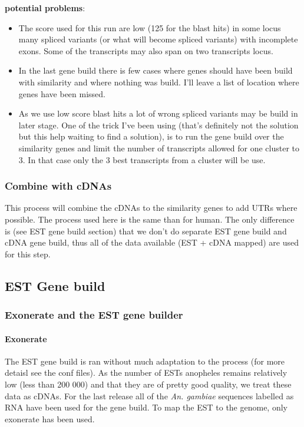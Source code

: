 \documentclass[a4paper,10pt]{article}
\begin{document}
\textbf{potential problems}: 
\begin{itemize}
\item The score used for this run are low (125 for the blast hits) in some locus many spliced variants (or what will become spliced variants) with incomplete exons. Some of the transcripts may also span on two transcripts locus.
\item In the last gene build there is few cases where genes should have been build with similarity and where nothing was build. I'll leave a list of location where genes have been missed.
\item As we use low score blast hits a lot of wrong spliced variants may be build in later stage. One of the trick I've been using (that's definitely not the solution but this help waiting to find a solution), is to run the gene build over the similarity genes and limit the number of transcripts allowed for one cluster to 3. In that case only the 3 best transcripts from a cluster will be use.

\end{itemize}

\subsubsection{Combine with cDNAs}
This process will combine the cDNAs to the similarity genes to add UTRs where possible. The process used here is the same than for human. The only difference is (see EST gene build section) that we don't do separate EST gene build and cDNA gene build, thus all of the data available (EST + cDNA mapped) are used for this step.

\subsection{EST Gene build}
\subsubsection{Exonerate and the EST gene builder}
\paragraph{Exonerate}
The EST gene build is ran without much adaptation to the process (for more detaisl see the conf files). As the number of ESTs anopheles remains relatively low (less than 200 000) and that they are of pretty good quality, we treat these data as cDNAs. For the last release all of the \textit{An. gambiae} sequences labelled as RNA have been used for the gene build. 
To map the EST to the genome, only exonerate has been used.
\end{document}
